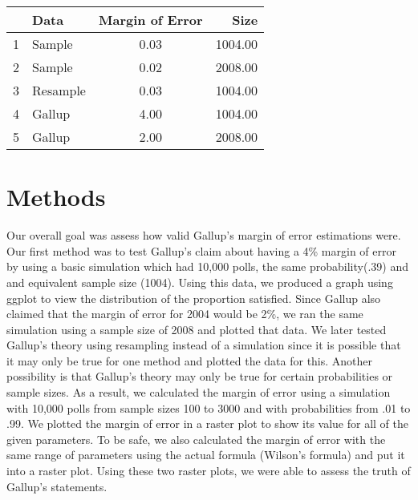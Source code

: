 \documentclass{article}\usepackage[]{graphicx}\usepackage[]{xcolor}
\newenvironment{Figure}
  {\par\medskip\noindent\minipage{\linewidth}}
  {\endminipage\par\medskip}
\begin{document}
\begin{multicols}{2}
\begin{Figure}
\centering
\begin{tabular}{rlcr}
  \hline
 & Data & Margin of Error & Size \\ 
  \hline
1 & Sample & 0.03 & 1004.00 \\ 
  2 & Sample & 0.02 & 2008.00 \\ 
  3 & Resample & 0.03 & 1004.00 \\ 
  4 & Gallup & 4.00 & 1004.00 \\ 
  5 & Gallup & 2.00 & 2008.00 \\ 
   \hline
\end{tabular}
\label{tab:penguins}
\end{Figure}

\section{Methods}
Our overall goal was assess how valid Gallup's margin of error estimations were. Our first method was to test Gallup's claim about having a 4\% margin of error by using a basic simulation which had 10,000 polls, the same probability(.39) and and equivalent sample size (1004). Using this data, we produced a graph using ggplot \citep{ggplot2} to view the distribution of the proportion satisfied. Since Gallup also claimed that the margin of error for 2004 would be 2\%, we ran the same simulation using a sample size of 2008 and plotted that data. We later tested Gallup's theory using resampling instead of a simulation since it is possible that it may only be true for one method and plotted the data for this. Another possibility is that Gallup's theory may only be true for certain probabilities or sample sizes. As a result, we calculated the margin of error using a simulation with 10,000 polls from sample sizes 100 to 3000 and with probabilities from .01 to .99. We plotted the margin of error in a raster plot to show its value for all of the given parameters. To be safe, we also calculated the margin of error with the same range of parameters using the actual formula (Wilson's formula) and put it into a raster plot. Using these two raster plots, we were able to assess the truth of Gallup's statements. 


\end{multicols}
\end{document}
